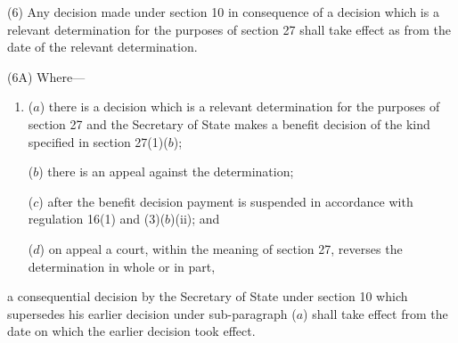 \documentclass[12pt,a4paper]{article}
\begin{document}
(6) Any decision made under section 10 in consequence of a decision which is a relevant determination for the purposes of section 27 shall take effect as from the date of the relevant determination.

(6A) Where—
\begin{enumerate}\item[]
($a$) there is a decision which is a relevant determination for the purposes of section 27 and the Secretary of State makes a benefit decision of the kind specified in section 27(1)($b$);

($b$) there is an appeal against the determination;

($c$) after the benefit decision payment is suspended in accordance with regulation 16(1) and (3)($b$)(ii); and

($d$) on appeal a court, within the meaning of section 27, reverses the determination in whole or in part,
\end{enumerate}
a consequential decision by the Secretary of State under section 10 which supersedes his earlier decision under sub-paragraph ($a$)  shall take effect from the date on which the earlier decision took effect.



\end{document}
